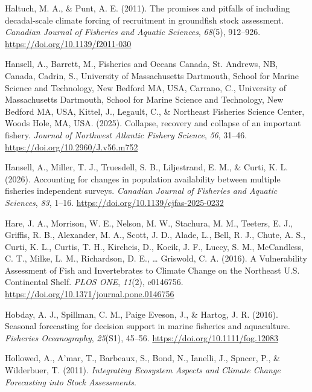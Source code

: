 \documentclass[
  12pt,
]{article}
\newlength{\cslhangindent}
\newenvironment{CSLReferences}[2] %
 {\begin{list}{}{%
  \setlength{\itemindent}{0pt}
  \setlength{\leftmargin}{0pt}
  \setlength{\parsep}{0pt}
  \ifodd #1
   \setlength{\leftmargin}{\cslhangindent}
   \setlength{\itemindent}{-1\cslhangindent}
  \fi
  \setlength{\itemsep}{#2\baselineskip}}}
 {\end{list}}
\begin{document}
\begin{CSLReferences}{1}{2}
Haltuch, M. A., \& Punt, A. E. (2011). The promises and pitfalls of including decadal-scale climate forcing of recruitment in groundfish stock assessment. \emph{Canadian Journal of Fisheries and Aquatic Sciences}, \emph{68}(5), 912--926. \url{https://doi.org/10.1139/f2011-030}

Hansell, A., Barrett, M., Fisheries and Oceans Canada, St. Andrews, NB, Canada, Cadrin, S., University of Massachusetts Dartmouth, School for Marine Science and Technology, New Bedford MA, USA, Carrano, C., University of Massachusetts Dartmouth, School for Marine Science and Technology, New Bedford MA, USA, Kittel, J., Legault, C., \& Northeast Fisheries Science Center, Woods Hole, MA, USA. (2025). Collapse, recovery and collapse of an important fishery. \emph{Journal of Northwest Atlantic Fishery Science}, \emph{56}, 31--46. \url{https://doi.org/10.2960/J.v56.m752}

Hansell, A., Miller, T. J., Truesdell, S. B., Liljestrand, E. M., \& Curti, K. L. (2026). Accounting for changes in population availability between multiple fisheries independent surveys. \emph{Canadian Journal of Fisheries and Aquatic Sciences}, \emph{83}, 1--16. \url{https://doi.org/10.1139/cjfas-2025-0232}

Hare, J. A., Morrison, W. E., Nelson, M. W., Stachura, M. M., Teeters, E. J., Griffis, R. B., Alexander, M. A., Scott, J. D., Alade, L., Bell, R. J., Chute, A. S., Curti, K. L., Curtis, T. H., Kircheis, D., Kocik, J. F., Lucey, S. M., McCandless, C. T., Milke, L. M., Richardson, D. E., \ldots{} Griswold, C. A. (2016). A Vulnerability Assessment of Fish and Invertebrates to Climate Change on the Northeast U.S. Continental Shelf. \emph{PLOS ONE}, \emph{11}(2), e0146756. \url{https://doi.org/10.1371/journal.pone.0146756}

Hobday, A. J., Spillman, C. M., Paige Eveson, J., \& Hartog, J. R. (2016). Seasonal forecasting for decision support in marine fisheries and aquaculture. \emph{Fisheries Oceanography}, \emph{25}(S1), 45--56. \url{https://doi.org/10.1111/fog.12083}

Hollowed, A., A'mar, T., Barbeaux, S., Bond, N., Ianelli, J., Spncer, P., \& Wilderbuer, T. (2011). \emph{Integrating Ecosystem Aspects and Climate Change Forecasting into Stock Assessments}.


\end{CSLReferences}
\end{document}
